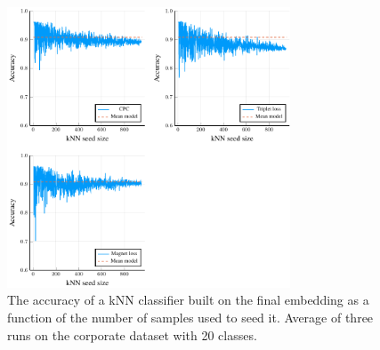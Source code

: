 \begin{figure}
  \centering
  \includegraphics[width=0.75\textwidth]{images/cisco-multiclass/kNN/cisco-multiclass-kNN.pdf}
  \caption{The accuracy of a kNN classifier built on the final embedding as a function of the number of samples used to seed it. Average of three runs on the corporate dataset with 20 classes.}\label{fig:cisco-multiclass-kNN}
\end{figure}
